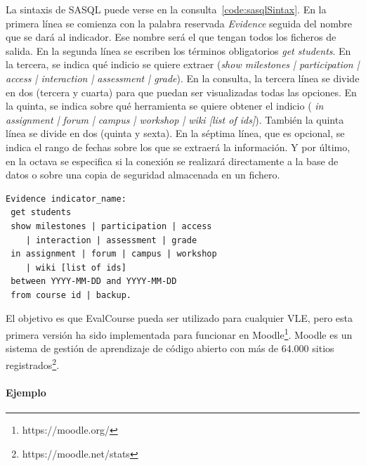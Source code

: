 			La sintaxis de SASQL puede verse en la consulta~\ref{code:sasqlSintax}. En la primera línea se comienza con la palabra reservada \emph{Evidence} seguida del nombre que se dará al indicador. Ese nombre será el que tengan todos los ficheros de salida. En la segunda línea se escriben los términos obligatorios \emph{get students}. En la tercera, se indica qué indicio se quiere extraer (\emph{show milestones | participation | access | interaction | assessment | grade}). En la consulta, la tercera línea se divide en dos (tercera y cuarta) para que puedan ser visualizadas todas las opciones. En la quinta, se indica sobre qué herramienta se quiere obtener el indicio (\emph{ in assignment | forum | campus | workshop | wiki [list of ids]}). También la quinta línea se divide en dos (quinta y sexta). En la séptima línea, que es opcional, se indica el rango de fechas sobre los que se extraerá la información. Y por último, en la octava se especifica si la conexión se realizará directamente a la base de datos o sobre una copia de seguridad almacenada en un fichero.



\begin{verbatim}
Evidence indicator_name:
 get students 
 show milestones | participation | access 
	| interaction | assessment | grade
 in assignment | forum | campus | workshop 
	| wiki [list of ids]
 between YYYY-MM-DD and YYYY-MM-DD
 from course id | backup.
\end{verbatim}

			El objetivo es que EvalCourse pueda ser utilizado para cualquier VLE, pero esta primera versión ha sido implementada para funcionar en Moodle\footnote{https://moodle.org/}. Moodle es un sistema de gestión de aprendizaje de código abierto con más de 64.000 sitios registrados\footnote{https://moodle.net/stats}.


			\paragraph{Ejemplo}

